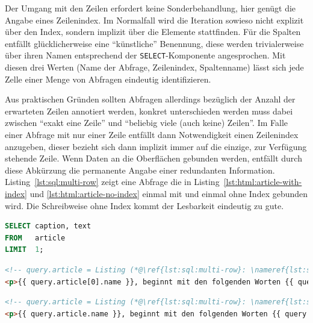 Der Umgang mit den Zeilen erfordert keine Sonderbehandlung, hier genügt die Angabe eines Zeilenindex. Im Normalfall wird die Iteration sowieso nicht explizit über den Index, sondern implizit über die Elemente stattfinden. Für die Spalten entfällt glücklicherweise eine "`künstliche"' Benennung, diese werden trivialerweise über ihren Namen entsprechend der \texttt{SELECT}-Komponente angesprochen. Mit diesen drei Werten (Name der Abfrage, Zeilenindex, Spaltenname) lässt sich jede Zelle einer Menge von Abfragen eindeutig identifizieren.

Aus praktischen Gründen sollten Abfragen allerdings bezüglich der Anzahl der erwarteten Zeilen annotiert werden, konkret unterschieden werden muss dabei zwischen "`exakt eine Zeile"' und "`beliebig viele (auch keine) Zeilen"'. Im Falle einer Abfrage mit nur einer Zeile entfällt dann Notwendigkeit einen Zeilenindex anzugeben, dieser bezieht sich dann implizit immer auf die einzige, zur Verfügung stehende Zeile. Wenn Daten an die Oberflächen gebunden werden, entfällt durch diese Abkürzung die permanente Angabe einer redundanten Information. Listing~\ref{lst:sql:multi-row} zeigt eine Abfrage die in Listing~\ref{lst:html:article-with-index} und \ref{lst:html:article-no-index} einmal mit und einmal ohne Index gebunden wird. Die Schreibweise ohne Index kommt der Lesbarkeit eindeutig zu gute.

\begin{lstlisting}[float=h, language=SQL, caption=Abfrage mit maximal einer Ergebniszeile,label=lst:sql:multi-row]
SELECT caption, text
FROM   article
LIMIT  1;
\end{lstlisting}

\begin{lstlisting}[float=h, language=HTML, caption=String-Interpolation mit Indexzugriff, label=lst:html:article-with-index]
<!-- query.article = Listing (*@\ref{lst:sql:multi-row}: \nameref{lst:sql:multi-row}@*) -->
<p>{{ query.article[0].name }}, beginnt mit den folgenden Worten {{ query.article[0].text | truncatewords: 4 }}.</p>
\end{lstlisting}

\begin{lstlisting}[float=h, language=HTML, caption=String-Interpolation mit implizitem Index, label=lst:html:article-no-index]
<!-- query.article = Listing (*@\ref{lst:sql:multi-row}: \nameref{lst:sql:multi-row}@*) -->
<p>{{ query.article.name }}, beginnt mit den folgenden Worten {{ query.article.text | truncatewords: 4 }}.</p>
\end{lstlisting}

